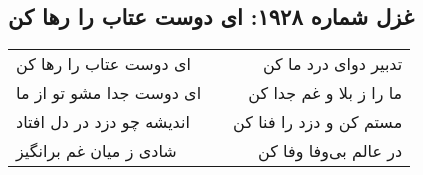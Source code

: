 \begin{center}
\section*{غزل شماره ۱۹۲۸: ای دوست عتاب را رها کن}
\label{sec:1928}
\begin{longtable}{l p{0.5cm} r}
ای دوست عتاب را رها کن
&&
تدبیر دوای درد ما کن
\\
ای دوست جدا مشو تو از ما
&&
ما را ز بلا و غم جدا کن
\\
اندیشه چو دزد در دل افتاد
&&
مستم کن و دزد را فنا کن
\\
شادی ز میان غم برانگیز
&&
در عالم بی‌وفا وفا کن
\\
\end{longtable}
\end{center}
